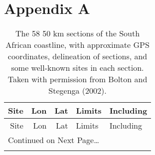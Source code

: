 \documentclass[10pt,A4,]{article}
\begin{document}
\newpage

\section*{\large{Appendix A}}

\begin{tiny}
\begin{center}
\setlength\tabcolsep{4pt}
\begin{longtable}{|r|r|r|l|p{6cm}|}
\caption{The 58 \texttimes{} 50 km sections of the South African coastline, with approximate GPS coordinates, delineation of sections, and some well-known sites in each section. Taken with permission from Bolton and Stegenga (2002).} \\

\toprule
Site & Lon & Lat & Limits & Including \\
\midrule
\endfirsthead

\toprule
Site & Lon & Lat & Limits & Including \\
\midrule
\endhead

\midrule
\multicolumn{5}{l}{{Continued on Next Page\ldots}} \\
\endfoot

\bottomrule
\endlastfoot


\end{longtable}
\end{center}
\end{tiny}
\end{document}

